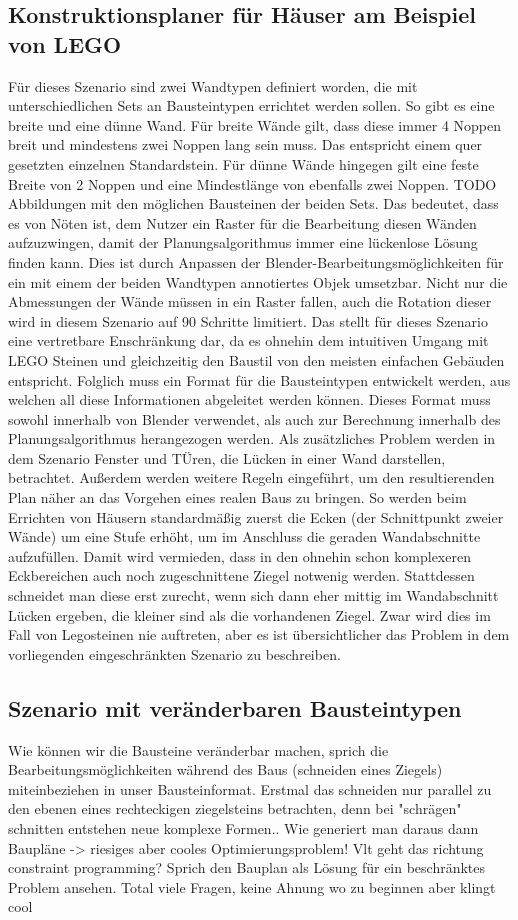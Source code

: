 \subsection{Konstruktionsplaner für Häuser am Beispiel von LEGO}
Für dieses Szenario sind zwei Wandtypen definiert worden, die mit unterschiedlichen Sets an Bausteintypen errichtet werden sollen.
So gibt es eine breite und eine dünne Wand.
Für breite Wände gilt, dass diese immer 4 Noppen breit und mindestens zwei Noppen lang sein muss.
Das entspricht einem quer gesetzten einzelnen Standardstein.
Für dünne Wände hingegen gilt eine feste Breite von 2 Noppen und eine Mindestlänge von ebenfalls zwei Noppen.
TODO Abbildungen mit den möglichen Bausteinen der beiden Sets.
Das bedeutet, dass es von Nöten ist, dem Nutzer ein Raster für die Bearbeitung diesen Wänden aufzuzwingen, damit der Planungsalgorithmus immer eine lückenlose Lösung finden kann.
Dies ist durch Anpassen der Blender-Bearbeitungsmöglichkeiten für ein mit einem der beiden Wandtypen annotiertes Objek umsetzbar.
Nicht nur die Abmessungen der Wände müssen in ein Raster fallen, auch die Rotation dieser wird in diesem Szenario auf 90\textdegree{} Schritte limitiert. 
Das stellt für dieses Szenario eine vertretbare Enschränkung dar, da es ohnehin dem intuitiven Umgang mit LEGO Steinen und gleichzeitig den Baustil von den meisten einfachen Gebäuden entspricht.
Folglich muss ein Format für die Bausteintypen entwickelt werden, aus welchen all diese Informationen abgeleitet werden können.
Dieses Format muss sowohl innerhalb von Blender verwendet, als auch zur Berechnung innerhalb des Planungsalgorithmus herangezogen werden.
Als zusätzliches Problem werden in dem Szenario Fenster und TÜren, die Lücken in einer Wand darstellen, betrachtet.
Außerdem werden weitere Regeln eingeführt, um den resultierenden Plan näher an das Vorgehen eines realen Baus zu bringen.
So werden beim Errichten von Häusern standardmäßig zuerst die Ecken (der Schnittpunkt zweier Wände) um eine Stufe erhöht, um im Anschluss die geraden Wandabschnitte aufzufüllen.
Damit wird vermieden, dass in den ohnehin schon komplexeren Eckbereichen auch noch zugeschnittene Ziegel notwenig werden.
Stattdessen schneidet man diese erst zurecht, wenn sich dann eher mittig im Wandabschnitt Lücken ergeben, die kleiner sind als die vorhandenen Ziegel.
Zwar wird dies im Fall von Legosteinen nie auftreten, aber es ist übersichtlicher das Problem in dem vorliegenden eingeschränkten Szenario zu beschreiben.

\subsection{Szenario mit veränderbaren Bausteintypen}
Wie können wir die Bausteine veränderbar machen, sprich die Bearbeitungsmöglichkeiten während des Baus (schneiden eines Ziegels) miteinbeziehen in unser Bausteinformat.
Erstmal das schneiden nur parallel zu den ebenen eines rechteckigen ziegelsteins betrachten, denn bei "schrägen" schnitten entstehen neue komplexe Formen..
Wie generiert man daraus dann Baupläne -> riesiges aber cooles Optimierungsproblem!
Vlt geht das richtung constraint programming? Sprich den Bauplan als Lösung für ein beschränktes Problem ansehen.
Total viele Fragen, keine Ahnung wo zu beginnen aber klingt cool

